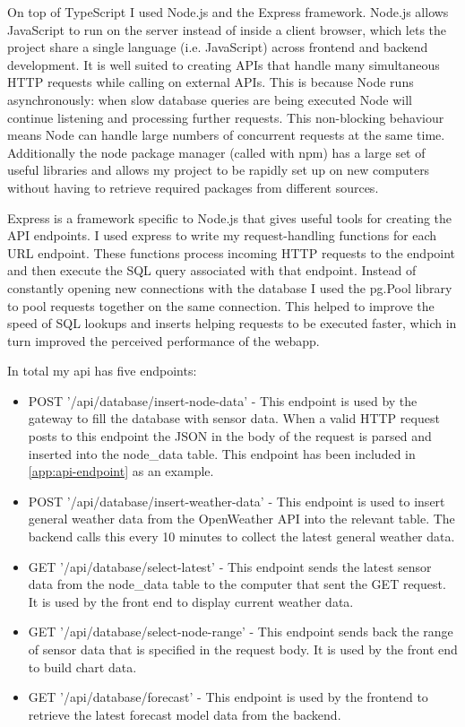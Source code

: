 On top of TypeScript I used Node.js and the Express framework. Node.js allows
JavaScript to run on the server instead of inside a client browser, which lets
the project share a single language (i.e. JavaScript) across frontend and
backend development. It is well suited to creating APIs that handle many
simultaneous HTTP requests while calling on external APIs. This is because Node
runs asynchronously: when slow database queries are being executed Node will
continue listening and processing further requests. This non-blocking behaviour
means Node can handle large numbers of concurrent requests at the same time.
Additionally the node package manager (called with npm) has a large set of
useful libraries and allows my project to be rapidly set up on new computers
without having to retrieve required packages from different sources.

Express is a framework specific to Node.js that gives useful tools for creating
the API endpoints. I used express to write my request-handling functions for
each URL endpoint. These functions process incoming HTTP requests to the
endpoint and then execute the SQL query associated with that endpoint. Instead
of constantly opening new connections with the database I used the pg.Pool
library to pool requests together on the same connection. This helped to improve
the speed of SQL lookups and inserts helping requests to be executed faster,
which in turn improved the perceived performance of the webapp.

In total my api has five endpoints:

\begin{itemize}
  \item POST '/api/database/insert-node-data' - This endpoint is used by the
  gateway to fill the database with sensor data. When a valid HTTP request posts
  to this endpoint the JSON in the body of the request is parsed and inserted
  into the node\_data table. This endpoint has been included in
  \ref{app:api-endpoint} as an example.
  \item POST '/api/database/insert-weather-data' - This endpoint is used to
  insert general weather data from the OpenWeather API into the relevant table.
  The backend calls this every 10 minutes to collect the latest general weather
  data.
  \item GET '/api/database/select-latest' - This endpoint sends the latest
  sensor data from the node\_data table to the computer that sent the GET
  request. It is used by the front end to display current weather data.
  \item GET '/api/database/select-node-range' - This endpoint sends back the
  range of sensor data that is specified in the request body. It is used by the
  front end to build chart data.
  \item GET '/api/database/forecast' - This endpoint is used by the frontend to
  retrieve the latest forecast model data from the backend.
\end{itemize}

